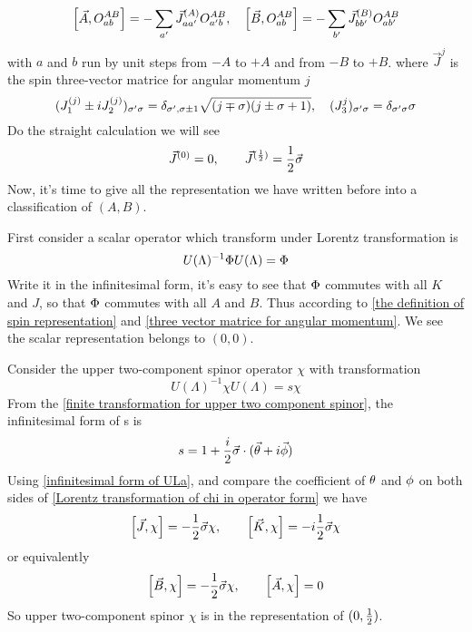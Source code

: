 \begin{equation} \label{the definition of spin representation}
\comm{\vec{A}}{O_{ab}^{AB}} = -\sum_{a'}\vec{J}^{(A)}_{aa'}O^{AB}_{a'b},\quad
\comm{\vec{B}}{O_{ab}^{AB}} = -\sum_{b'}\vec{J}^{(B)}_{bb'}O^{AB}_{ab'}
\end{equation}
with $a$ and $b$ run by unit steps from $-A$ to $+A$ and from $-B$ to $+B$. where $\vec{J}^{j}$ is the spin three-vector  matrice for angular momentum $j$
\begin{equation} \label{three vector matrice for angular momentum}
(J_1^{(j)}\pm i J_2^{(j)})_{\sigma'\sigma} = \delta_{\sigma',\sigma\pm 1}
\sqrt{(j\mp\sigma)(j\pm\sigma+1)},\quad
(J_3^{j})_{\sigma'\sigma} = \delta_{\sigma'\sigma} \sigma
\end{equation}
Do the straight calculation we will see
\begin{equation}
  \vec{J}^{(0)} = 0, \qquad
\vec{J}^{(\frac{1}{2})} = \frac{1}{2} \vec{\sigma}
\end{equation}
Now, it's time to give all the representation we have written before into a classification of $(A,B)$.

First consider a scalar operator which transform under Lorentz transformation is
\begin{equation}
  U(\Lambda)^{-1} \Phi U(\Lambda) = \Phi
\end{equation}
Write it in the infinitesimal form, it's easy to see that $\Phi$ commutes with all $K$ and $J$, so that  $\Phi$ commutes with all $A$ and $B$. Thus according to \eqref{the definition of spin representation} and \eqref{three vector matrice for angular momentum}. We see the scalar representation belongs to $(0,0)$.

Consider the upper two-component spinor operator $\chi$ with transformation
\begin{equation} \label{Lorentz transformation of chi in operator form}
U(\Lambda)^{-1}\chi U(\Lambda) = s \chi
\end{equation}
From the \eqref{finite transformation for upper two component spinor}, the infinitesimal form of s is
\begin{equation}
  s = 1 + \frac{i}{2} \vec{\sigma}\cdot(\vec{\theta}+i\vec{\phi})
\end{equation}
Using \eqref{infinitesimal form of ULa}, and compare the coefficient of $\theta$ and $\phi$ on both sides of \eqref{Lorentz transformation of chi in operator form} we have
\begin{equation}
  \comm{\vec{J}}{\chi} = -\half \vec{\s}\chi,\qquad
\comm{\vec{K}}{\chi} = - i\half \vec{\s}\chi
\end{equation}
or equivalently
\begin{equation}
  \comm{\vec{B}}{\chi} =- \half \vec{\s}\chi,\qquad
\comm{\vec{A}}{\chi} =0
\end{equation}
So upper two-component spinor $\chi$ is in the representation of $(0,\frac{1}{2})$.

